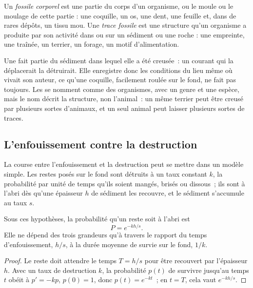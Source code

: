 \begin{definition}\label{def:b2:palaeoenvironments:fossil-kinds} Un
\emph{fossile corporel} est une partie du corps d'un organisme, ou le moule ou le moulage
de cette partie : une coquille, un os, une dent, une feuille et, dans de rares dépôts, un tissu mou. Une
\emph{trace fossile} est une structure qu'un organisme a produite par son activité dans ou
sur un sédiment ou une roche : une empreinte, une traînée, un terrier, un forage, un motif d'alimentation.
\end{definition}

Une  fait partie du sédiment dans lequel elle a été creusée~: un courant qui la déplacerait
la détruirait. Elle enregistre donc les conditions du lieu même où vivait son auteur, ce qu'une coquille,
facilement roulée sur le fond, ne fait pas toujours. Les  se nomment comme des
organismes, avec un genre et une espèce, mais le nom décrit la structure, non l'animal~: un même terrier peut
être creusé par plusieurs sortes d'animaux, et un seul animal peut laisser plusieurs sortes de traces.

\subsection*{L'enfouissement contre la destruction}

La course entre l'enfouissement et la destruction peut se mettre dans un modèle simple.
Les restes posés sur le fond sont détruits à un taux constant $k$, la probabilité
par unité de temps qu'ils soient mangés, brisés ou dissous~; ils sont à l'abri dès
qu'une épaisseur $h$ de sédiment les recouvre, et le sédiment s'accumule au taux $s$.

\begin{proposition}\label{prop:b2:palaeoenvironments:burial}
Sous ces hypothèses, la probabilité qu'un reste soit à l'abri est
\[
  P = e^{-kh/s}.
\]
Elle ne dépend des trois grandeurs qu'à travers le rapport du temps
d'enfouissement, $h/s$, à la durée moyenne de survie sur le fond, $1/k$.
\end{proposition}

\begin{proof}
Le reste doit attendre le temps $T = h/s$ pour être recouvert par l'épaisseur $h$. Avec un taux de
destruction $k$, la probabilité $p(t)$ de survivre jusqu'au temps $t$ obéit à $p' = -kp$, $p(0) =
1$, donc $p(t) = e^{-kt}$~; en $t = T$, cela vaut $e^{-kh/s}$.
\end{proof}

